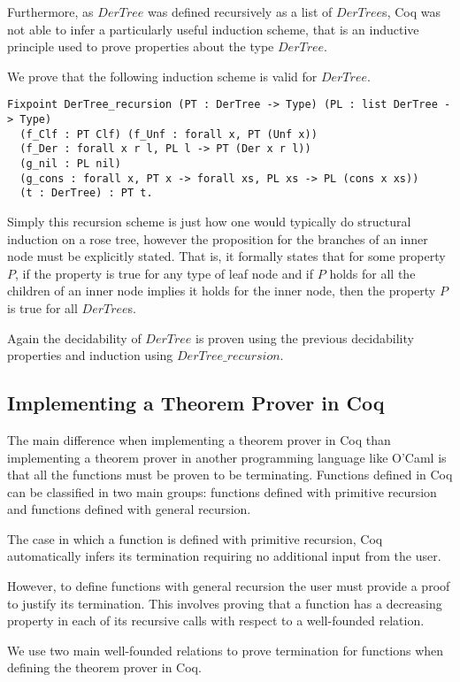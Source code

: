 \documentclass{article}
\begin{document}
Furthermore, as $DerTree$ was defined recursively as a list of $DerTree$s, Coq
was not able to infer a particularly useful induction scheme, that is an
inductive principle used to prove properties about the type $DerTree$.

We prove that the following induction scheme is valid for $DerTree$.

\begin{lstlisting}
Fixpoint DerTree_recursion (PT : DerTree -> Type) (PL : list DerTree -> Type)
  (f_Clf : PT Clf) (f_Unf : forall x, PT (Unf x))
  (f_Der : forall x r l, PL l -> PT (Der x r l))
  (g_nil : PL nil)
  (g_cons : forall x, PT x -> forall xs, PL xs -> PL (cons x xs)) 
  (t : DerTree) : PT t.
\end{lstlisting}

Simply this recursion scheme is just how one would typically do structural
induction on a rose tree, however the proposition for the branches of an inner
node must be explicitly stated. That is, it formally states that for some
property $P$, if the property is true for any type of leaf node and if $P$
holds for all the children of an inner node implies it holds for the inner
node, then the property $P$ is true for all $DerTree$s.

Again the decidability of $DerTree$ is proven using the previous
decidability properties and induction using $DerTree\_recursion$.

\subsection{Implementing a Theorem Prover in Coq}

The main difference when implementing a theorem prover in Coq than implementing
a theorem prover in another programming language like O'Caml is that all the
functions must be proven to be terminating. Functions defined in Coq can be
classified in two main groups: functions defined with primitive recursion and
functions defined with general recursion.

The case in which a function is defined with primitive recursion, Coq
automatically infers its termination requiring no additional input from the
user.

However, to define functions with general recursion the user must provide a
proof to justify its termination. This involves proving that a function has a
decreasing property in each of its recursive calls with respect to a
well-founded relation.

We use two main well-founded relations to prove termination for functions when
defining the theorem prover in Coq.
\end{document}
